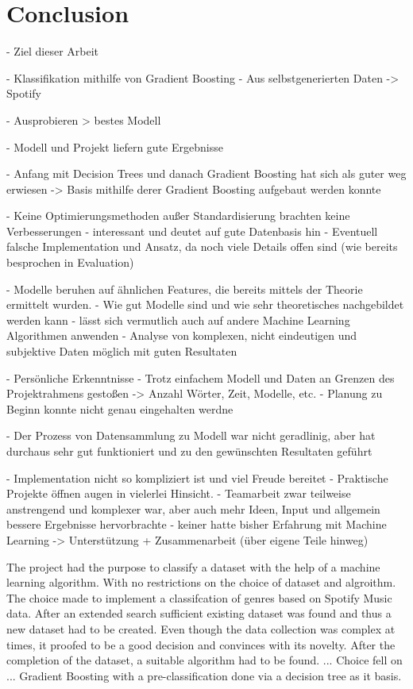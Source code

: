 \section{Conclusion}

- Ziel dieser Arbeit 

    - Klassifikation mithilfe von Gradient Boosting 
    - Aus selbstgenerierten Daten -> Spotify

    - Ausprobieren > bestes Modell 

- Modell und Projekt liefern gute Ergebnisse 

    - Anfang mit Decision Trees und danach Gradient Boosting hat sich als guter weg erwiesen
        -> Basis mithilfe derer Gradient Boosting aufgebaut werden konnte 

    - Keine Optimierungsmethoden außer Standardisierung brachten keine Verbesserungen
        - interessant und deutet auf gute Datenbasis hin 
        - Eventuell falsche Implementation und Ansatz, da noch viele Details offen sind (wie bereits besprochen in Evaluation)

    - Modelle beruhen auf ähnlichen Features, die bereits mittels der Theorie ermittelt wurden. 
        - Wie gut Modelle sind und wie sehr theoretisches nachgebildet werden kann
        - lässt sich vermutlich auch auf andere Machine Learning Algorithmen anwenden 
            - Analyse von komplexen, nicht eindeutigen und subjektive Daten möglich mit guten Resultaten 

-   Persönliche Erkenntnisse
    - Trotz einfachem Modell und Daten an Grenzen des Projektrahmens gestoßen -> Anzahl Wörter, Zeit, Modelle, etc. 
        - Planung zu Beginn konnte nicht genau eingehalten werdne 

    - Der Prozess von Datensammlung zu Modell war nicht geradlinig, aber hat durchaus sehr gut funktioniert und zu den 
      gewünschten Resultaten geführt 

    - Implementation nicht so kompliziert ist und viel Freude bereitet
    - Praktische Projekte öffnen augen in vielerlei Hinsicht. 
    - Teamarbeit zwar teilweise anstrengend und komplexer war, aber auch mehr Ideen, Input und allgemein bessere Ergebnisse hervorbrachte 
        - keiner hatte bisher Erfahrung mit Machine Learning -> Unterstützung  + Zusammenarbeit (über eigene Teile hinweg)

The project had the purpose to classify a dataset with the help of a machine learning algorithm. With no restrictions on the 
choice of dataset and algroithm. The choice made to implement a classifcation of genres based on Spotify Music data. After an 
extended search sufficient existing dataset was found and thus a new dataset had to be created. Even though the data collection 
was complex at times, it proofed to be a good decision and convinces with its novelty. After the completion of the dataset, a 
suitable algorithm had to be found. ... Choice fell on ... Gradient Boosting with a pre-classification done via a decision tree
as it basis. 
